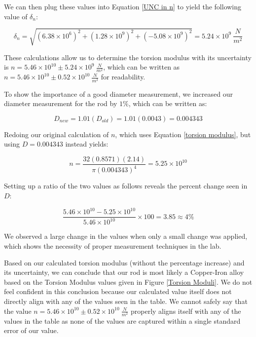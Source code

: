 \documentclass[12pt]{article}
\begin{document}
We can then plug these values into Equation \ref{UNC in n} to yield the following value of $\delta_n$:

\begin{equation*}
    \delta_n=\sqrt{(6.38\times10^6)^2+(1.28\times10^9)^2+(-5.08\times10^{9})^2}=5.24\times10^9\ \frac{N}{m^2}
\end{equation*}

These calculations allow us to determine the torsion modulus with its uncertainty is $n=5.46\times10^{10}\pm5.24\times10^9\ \frac{N}{m^2}$, which can be written as $n=5.46\times10^{10}\pm0.52\times10^{10}\ \frac{N}{m^2}$ for readability. \par

To show the importance of a good diameter measurement, we increased our diameter measurement for the rod by $1\%$, which can be written as:

\begin{equation*}
    D_{new}=1.01(D_{old})=1.01(0.0043)=0.004343
\end{equation*}

\noindent Redoing our original calculation of $n$, which uses Equation \ref{torsion modulus}, but using $D=0.004343$ instead yields:

\begin{equation*}
    n=\frac{32(0.8571)(2.14)}{\pi(0.004343)^4}=5.25\times10^{10}
\end{equation*}

\noindent Setting up a ratio of the two values as follows reveals the percent change seen in $D$:

\begin{equation*}
    \frac{5.46\times10^{10}-5.25\times10^{10}}{5.46\times10^{10}}\times100=3.85\approx4\%
\end{equation*}

\noindent We observed a large change in the values when only a small change was applied, which shows the necessity of proper measurement techniques in the lab.

Based on our calculated torsion modulus (without the percentage increase) and its uncertainty, we can conclude that our rod is most likely a Copper-Iron alloy based on the Torsion Modulus values given in Figure \ref{Torsion Moduli}. We do not feel confident in this conclusion because our calculated value itself does not directly align with any of the values seen in the table. We cannot safely say that the value $n=5.46\times10^{10}\pm0.52\times10^{10}\ \frac{N}{m^2}$ properly aligns itself with any of the values in the table as none of the values are captured within a single standard error of our value.
\end{document}
